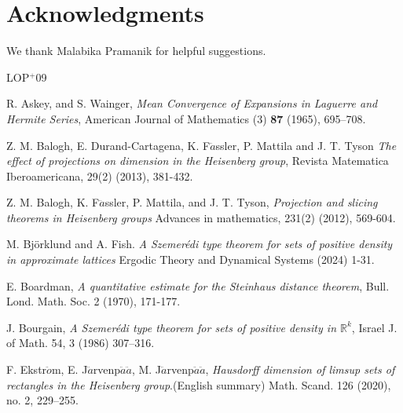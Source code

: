 \documentclass[11pt, reqno]{amsart}
\theoremstyle{plain}
\theoremstyle{remark}
\theoremstyle{example}
\theoremstyle{definition}
\numberwithin{equation}{section}
\begin{document}
\section*{Acknowledgments} 
We thank Malabika Pramanik for helpful suggestions.


\newcommand{\etalchar}[1]{$^{#1}$}
\providecommand{\bysame}{\leavevmode\hbox to3em{\hrulefill}\thinspace}
\providecommand{\MR}{\relax\ifhmode\unskip\space\fi MR }
\providecommand{\MRhref}[2]{%
  \href{http://www.ams.org/mathscinet-getitem?mr=#1}{#2}
}
\providecommand{\href}[2]{#2}
\begin{thebibliography}{LOP{\etalchar{+}}09}

 R. Askey, and S. Wainger, \emph{Mean Convergence of Expansions in Laguerre and Hermite Series}, American Journal of Mathematics (3) \textbf{87}
  (1965), 695--708.

 Z. M. Balogh, E. Durand-Cartagena, K. F$\ddot{a}$ssler, P. Mattila and J. T. Tyson \textit{The effect of projections on dimension in the Heisenberg group}, Revista Matematica Iberoamericana, 29(2) (2013), 381-432.

 Z. M. Balogh, K. F$\ddot{a}$ssler, P. Mattila, and J. T. Tyson, \textit{Projection and slicing theorems in Heisenberg groups} Advances in mathematics, 231(2) (2012), 569-604.

 M. Björklund and A. Fish. \textit{A Szemerédi type theorem for sets of positive density in approximate lattices} Ergodic Theory and Dynamical Systems (2024) 1-31.

 E. Boardman, {\em{A quantitative estimate for the Steinhaus distance theorem}}, Bull. Lond. Math. Soc. 2 (1970), 171-177. 

 J. Bourgain, \textit{A Szemer{\'e}di type theorem for sets of positive density in $\mathbb R^k$}, Israel J. of Math. 54, 3 (1986) 307--316.


 F. Ekstr$\ddot{o}$m, E. J$\ddot{a}$rvenp$\ddot{a}\ddot{a}$, M. J$\ddot{a}$rvenp$\ddot{a}\ddot{a}$, \textit{Hausdorff dimension of limsup sets of rectangles in the Heisenberg group}.(English summary) Math. Scand. 126 (2020), no. 2, 229–255.


\end{thebibliography}
\end{document}
